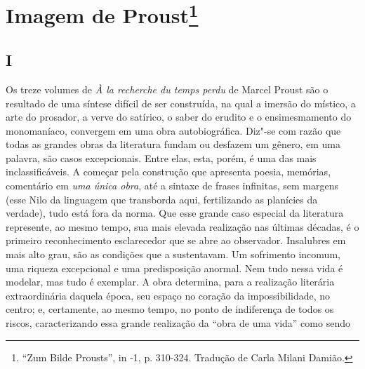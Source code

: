\chapter{Imagem de Proust\footnote[*]{``Zum Bilde Prousts'', in -1, p. 310-324. Tradução de Carla Milani Damião.}}

\section{I}

Os treze volumes de \emph{À la recherche du temps perdu} de Marcel
Proust são o resultado de uma síntese difícil de ser construída, na qual
a imersão do místico, a arte do prosador, a verve do satírico, o saber
do erudito e o ensimesmamento do monomaníaco, convergem em uma obra
autobiográfica. Diz"-se com razão que todas as grandes obras da
literatura fundam ou desfazem um gênero, em uma palavra, são casos
excepcionais. Entre elas, esta, porém, é uma das mais inclassificáveis.
A começar pela construção que apresenta poesia, memórias, comentário em
\emph{uma única obra}, até a sintaxe de frases infinitas, sem margens
(esse Nilo da linguagem que transborda aqui, fertilizando as planícies
da verdade), tudo está fora da norma. Que esse grande caso especial da
literatura represente, ao mesmo tempo, sua mais elevada realização nas
últimas décadas, é o primeiro reconhecimento esclarecedor que se abre ao
observador. Insalubres em mais alto grau, são as condições que a
sustentavam. Um sofrimento incomum, uma riqueza excepcional e uma
predisposição anormal. Nem tudo nessa vida é modelar, mas tudo é
exemplar. A obra determina, para a realização literária extraordinária
daquela época, seu espaço no coração da impossibilidade, no centro; e,
certamente, ao mesmo tempo, no ponto de indiferença de todos os riscos,
caracterizando essa grande realização da ``obra de uma vida'' como sendo
